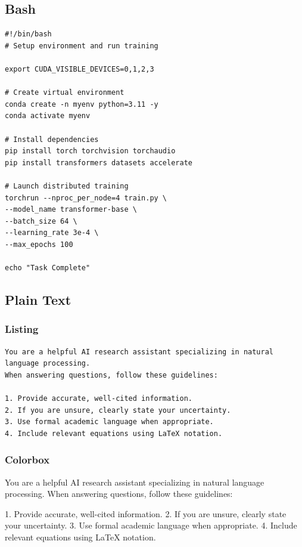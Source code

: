 \documentclass[opendfm]{xlance/xlance}
\begin{document}
\subsection{Bash}

\begin{lstlisting}[style=bash, caption={A Bash script example}]
#!/bin/bash
# Setup environment and run training

export CUDA_VISIBLE_DEVICES=0,1,2,3

# Create virtual environment
conda create -n myenv python=3.11 -y
conda activate myenv

# Install dependencies
pip install torch torchvision torchaudio
pip install transformers datasets accelerate

# Launch distributed training
torchrun --nproc_per_node=4 train.py \
--model_name transformer-base \
--batch_size 64 \
--learning_rate 3e-4 \
--max_epochs 100

echo "Task Complete"
\end{lstlisting}

\subsection{Plain Text}

\subsubsection{Listing}

\begin{lstlisting}[style=plain, caption={A plain text example}]
You are a helpful AI research assistant specializing in natural language processing.
When answering questions, follow these guidelines:

1. Provide accurate, well-cited information.
2. If you are unsure, clearly state your uncertainty.
3. Use formal academic language when appropriate.
4. Include relevant equations using LaTeX notation.
\end{lstlisting}

\subsubsection{Colorbox}

\begin{promptbox}[System Prompt]
    You are a helpful AI research assistant specializing in natural language processing.
    When answering questions, follow these guidelines:

    1. Provide accurate, well-cited information.
    2. If you are unsure, clearly state your uncertainty.
    3. Use formal academic language when appropriate.
    4. Include relevant equations using LaTeX notation.
\end{promptbox}
\end{document}

